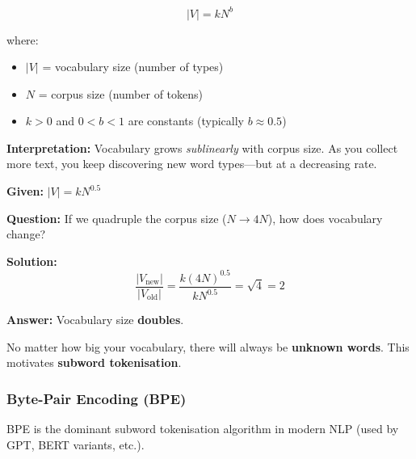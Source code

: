 \begin{thmbox}
\[
|V| = k N^b
\]

where:
\begin{itemize}
  \item $|V|$ = vocabulary size (number of types)
  \item $N$ = corpus size (number of tokens)
  \item $k > 0$ and $0 < b < 1$ are constants (typically $b \approx 0.5$)
\end{itemize}

\separator

\textbf{Interpretation:} Vocabulary grows \textit{sublinearly} with corpus size. As you collect more text, you keep discovering new word types---but at a decreasing rate.
\end{thmbox}

\begin{exbox}
\textbf{Given:} $|V| = k N^{0.5}$

\textbf{Question:} If we quadruple the corpus size ($N \to 4N$), how does vocabulary change?

\textbf{Solution:}
\[
\frac{|V_{\text{new}}|}{|V_{\text{old}}|} = \frac{k(4N)^{0.5}}{k N^{0.5}} = \sqrt{4} = 2
\]

\textbf{Answer:} Vocabulary size \textbf{doubles}.
\end{exbox}

\begin{tipbox}
No matter how big your vocabulary, there will always be \textbf{unknown words}. This motivates \textbf{subword tokenisation}.
\end{tipbox}

\separator

\subsubsection{Byte-Pair Encoding (BPE)}

BPE is the dominant subword tokenisation algorithm in modern NLP (used by GPT, BERT variants, etc.).

